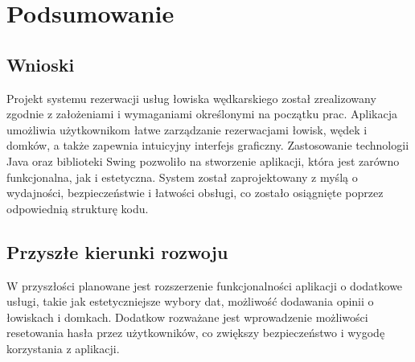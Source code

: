 \chapter{Podsumowanie}
\label{chap:podsumowanie}

\section{Wnioski}
Projekt systemu rezerwacji usług łowiska wędkarskiego został zrealizowany zgodnie z założeniami i wymaganiami określonymi na początku prac. Aplikacja umożliwia użytkownikom łatwe zarządzanie rezerwacjami łowisk, wędek i domków, a także zapewnia intuicyjny interfejs graficzny.
Zastosowanie technologii Java oraz biblioteki Swing pozwoliło na stworzenie aplikacji, która jest zarówno funkcjonalna, jak i estetyczna. System został zaprojektowany z myślą o wydajności, bezpieczeństwie i łatwości obsługi, co zostało osiągnięte poprzez odpowiednią strukturę kodu.
\section{Przyszłe kierunki rozwoju}
W przyszłości planowane jest rozszerzenie funkcjonalności aplikacji o dodatkowe usługi, takie jak estetyczniejsze wybory dat, możliwość dodawania opinii o łowiskach i domkach.
Dodatkow rozważane jest wprowadzenie możliwości resetowania hasła przez użytkowników, co zwiększy bezpieczeństwo i wygodę korzystania z aplikacji.

